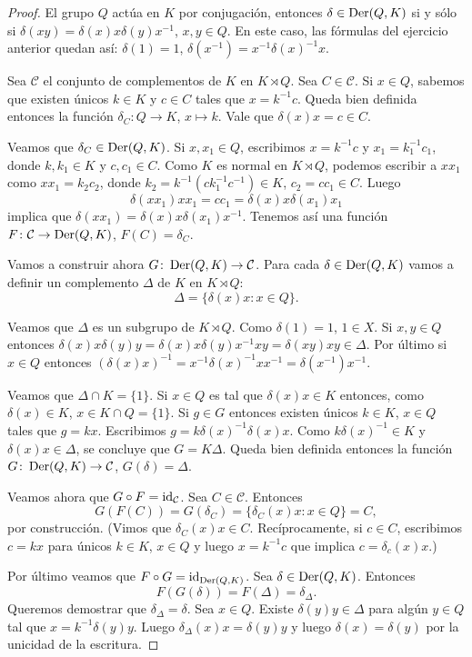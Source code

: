 \begin{proof}
	El grupo $Q$ actúa en $K$ por conjugación, entonces $\delta\in\operatorname{Der}(Q,K)$ si
	y sólo si $\delta(xy)=\delta(x)x\delta(y)x^{-1}$, $x,y\in Q$. En este caso,
	las fórmulas del ejercicio anterior quedan así:
	$\delta(1)=1$, $\delta(x^{-1})=x^{-1}\delta(x)^{-1}x$.
	
	Sea $\mathcal{C}$ el conjunto de complementos de $K$ en $K\rtimes Q$.  Sea
	$C\in\mathcal{C}$. Si $x\in Q$, sabemos que 
	existen únicos $k\in K$ y $c\in C$ tales que $x=k^{-1}c$. Queda bien
	definida entonces la función $\delta_C\colon Q\to K$, $x\mapsto k$. Vale
	que $\delta(x)x=c\in C$. 
	
	Veamos que $\delta_C\in\operatorname{Der}(Q,K)$. Si $x,x_1\in Q$, escribimos $x=k^{-1}c$
	y $x_1=k_1^{-1}c_1$, donde $k,k_1\in K$ y $c,c_1\in C$. Como $K$ es normal
	en $K\rtimes Q$, podemos escribir a $xx_1$ como $xx_1=k_2c_2$, donde
	$k_2=k^{-1}(ck_1^{-1}c^{-1})\in K$, $c_2=cc_1\in C$. Luego 
	\[
		\delta(xx_1)xx_1=cc_1=\delta(x)x\delta(x_1)x_1
	\]
	implica que $\delta(xx_1)=\delta(x)x\delta(x_1)x^{-1}$. 
	Tenemos así una función $F\colon\mathcal{C}\to\operatorname{Der}(Q,K)$, $F(C)=\delta_C$.

	Vamos a construir ahora $G\colon\operatorname{Der}(Q,K)\to\mathcal{C}$. 
	Para
	cada $\delta\in\operatorname{Der}(Q,K)$ vamos a definir un complemento $\Delta$ de $K$ en $K\rtimes Q$: 
	\[
	\Delta=\{\delta(x)x:x\in Q\}.
	\]

	Veamos que $\Delta$ es un subgrupo de $K\rtimes Q$. Como $\delta(1)=1$,
	$1\in X$. Si $x,y\in Q$ entonces
	$\delta(x)x\delta(y)y=\delta(x)x\delta(y)x^{-1}xy=\delta(xy)xy\in \Delta$.
	Por último si $x\in Q$ entonces
	$(\delta(x)x)^{-1}=x^{-1}\delta(x)^{-1}xx^{-1}=\delta(x^{-1})x^{-1}$.
	
	
	Veamos que $\Delta\cap K=\{1\}$. Si $x\in Q$ es tal que $\delta(x)x\in K$
	entonces, como $\delta(x)\in K$, $x\in K\cap Q=\{1\}$. Si $g\in G$ entonces
	existen únicos $k\in K$, $x\in Q$ tales que $g=kx$. Escribimos
	$g=k\delta(x)^{-1}\delta(x)x$. Como $k\delta(x)^{-1}\in K$ y $\delta(x)x\in
	\Delta$, se concluye que $G=K\Delta$. Queda bien definida entonces la
	función $G\colon\operatorname{Der}(Q,K)\to\mathcal{C}$, $G(\delta)=\Delta$.

	Veamos ahora que $G\circ F=\operatorname{id}_{\mathcal{C}}$. 
	Sea $C\in\mathcal{C}$. Entonces 
	\[
	G(F(C))=G(\delta_C)=\{\delta_C(x)x:x\in
	Q\}=C,
	\]
	por construcción. (Vimos que $\delta_C(x)x\in C$. Recíprocamente,  si $c\in
	C$, escribimos $c=kx$ para únicos $k\in K$, $x\in Q$ y luego $x=k^{-1}c$
	que implica $c=\delta_c(x)x$.)

	Por último veamos que $F\circ G=\operatorname{id}_{\operatorname{Der}(Q,K)}$. Sea $\delta\in\operatorname{Der}(Q,K)$.
	Entonces 
	\[
	F(G(\delta))=F(\Delta)=\delta_{\Delta}.
	\]
	Queremos demostrar que $\delta_\Delta=\delta$.  Sea $x\in Q$. Existe
	$\delta(y)y\in\Delta$ para algún $y\in Q$ tal que $x=k^{-1}\delta(y)y$.
	Luego $\delta_{\Delta}(x)x=\delta(y)y$ y luego $\delta(x)=\delta(y)$ por la
	unicidad de la escritura.
\end{proof}


